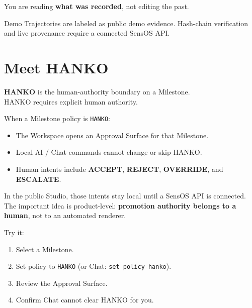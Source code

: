 \documentclass[11pt,a4paper,oneside]{article}
\newcommand{\pathcode}[1]{\texttt{#1}}
\begin{document}
You are reading \textbf{what was recorded}, not editing the past.

Demo Trajectories are labeled as public demo evidence. Hash-chain verification and live provenance require a connected SensOS API.

\section{Meet HANKO}
\label{sec:hanko}

\begin{notebox}
\textbf{HANKO} is the human-authority boundary on a Milestone.\\
HANKO requires explicit human authority.
\end{notebox}

When a Milestone policy is \pathcode{HANKO}:

\begin{itemize}
  \item The Workspace opens an Approval Surface for that Milestone.
  \item Local AI / Chat commands cannot change or skip HANKO.
  \item Human intents include \textbf{ACCEPT}, \textbf{REJECT}, \textbf{OVERRIDE}, and \textbf{ESCALATE}.
\end{itemize}

\begin{center}
\end{center}

In the public Studio, those intents stay local until a SensOS API is connected. The important idea is product-level: \textbf{promotion authority belongs to a human}, not to an automated renderer.

Try it:

\begin{enumerate}
  \item Select a Milestone.
  \item Set policy to \pathcode{HANKO} (or Chat: \pathcode{set policy hanko}).
  \item Review the Approval Surface.
  \item Confirm Chat cannot clear HANKO for you.
\end{enumerate}
\end{document}
